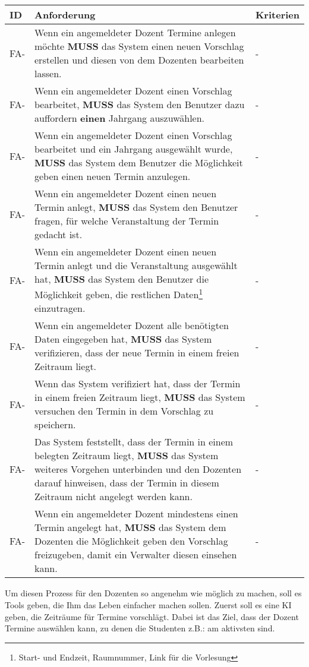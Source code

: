 \begin{tabular} {|p{}|p{11cm}|p{}|}
	\hline
	ID & Anforderung & Kriterien \\
	\hline
	FA-
	& Wenn ein angemeldeter Dozent Termine anlegen möchte \textbf{MUSS} das System einen neuen Vorschlag erstellen und diesen von dem Dozenten bearbeiten lassen.
	& - \\
	\hline
	FA-
	& Wenn ein angemeldeter Dozent einen Vorschlag bearbeitet, \textbf{MUSS} das System den Benutzer dazu auffordern \textbf{einen} Jahrgang auszuwählen. 
	& - \\
	\hline
	FA-
	& Wenn ein angemeldeter Dozent einen Vorschlag bearbeitet und ein Jahrgang ausgewählt wurde, \textbf{MUSS} das System dem Benutzer die Möglichkeit geben einen neuen Termin anzulegen.  
	& - \\
	\hline
	FA-
	& Wenn ein angemeldeter Dozent einen neuen Termin anlegt, \textbf{MUSS} das System den Benutzer fragen, für welche Veranstaltung der Termin gedacht ist.
	& - \\
	\hline
	FA-
	& Wenn ein angemeldeter Dozent einen neuen Termin anlegt und die Veranstaltung ausgewählt hat, \textbf{MUSS} das System den Benutzer die Möglichkeit geben, die restlichen Daten\footnote{Start- und Endzeit, Raumnummer, Link für die Vorlesung} einzutragen. 
	& - \\
	\hline
	FA-
	& Wenn ein angemeldeter Dozent alle benötigten Daten eingegeben hat, \textbf{MUSS} das System verifizieren, dass der neue Termin in einem freien Zeitraum liegt.
	& - \\
	\hline
	FA-
	& Wenn das System verifiziert hat, dass der Termin in einem freien Zeitraum liegt, \textbf{MUSS} das System versuchen den Termin in dem Vorschlag zu speichern.
	& - \\
	\hline
	FA-
	& Das System feststellt, dass der Termin in einem belegten Zeitraum liegt, \textbf{MUSS} das System weiteres Vorgehen unterbinden und den Dozenten darauf hinweisen, dass der Termin in diesem Zeitraum nicht angelegt werden kann.
	& - \\
	\hline
	FA-
	& Wenn ein angemeldeter Dozent mindestens einen Termin angelegt hat, \textbf{MUSS} das System dem Dozenten die Möglichkeit geben den Vorschlag freizugeben, damit ein Verwalter diesen einsehen kann.
	& - \\
	\hline
\end{tabular}


\newpage

Um diesen Prozess für den Dozenten so angenehm wie möglich zu machen, soll es Tools geben, die Ihm das Leben einfacher machen sollen. Zuerst soll es eine KI geben, die Zeiträume für Termine vorschlägt. Dabei ist das Ziel, dass der Dozent Termine auswählen kann, zu denen die Studenten z.B.: am aktivsten sind. 

